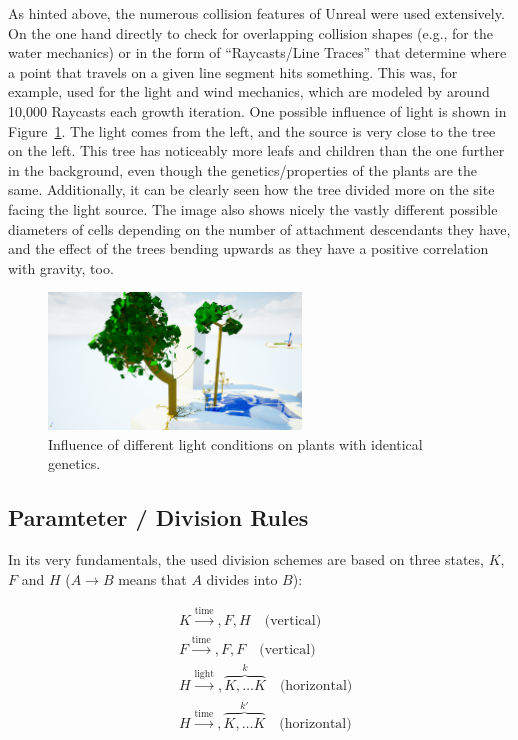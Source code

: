 \documentclass[11pt, abstract=on]{scrartcl}
\begin{document}
As hinted above, the numerous collision features of Unreal were used extensively. On the one hand directly to check for overlapping collision shapes (e.g., for the water mechanics) or in the form of ``Raycasts/Line Traces'' that determine where a point that travels on a given line segment hits something. This was, for example, used for the light and wind mechanics, which are modeled by around 10,000 Raycasts each growth iteration.
One possible influence of light is shown in Figure~\ref{fig:GrowToLight}. The light comes from the left, and the source is very close to the tree on the left. This tree has noticeably more leafs and children than the one further in the background, even though the genetics/properties of the plants are the same. Additionally, it can be clearly seen how the tree divided more on the site facing the light source. The image also shows nicely the vastly different possible diameters of cells depending on the number of attachment descendants they have, and the effect of the trees bending upwards as they have a positive correlation with gravity, too. 

\begin{figure}
 	 \centering
 	    \includegraphics[width=0.6\textwidth]{SS_GrowToLight.png}
 	 \caption{Influence of different light conditions on plants with identical genetics.}
 	 \label{fig:GrowToLight}
\end{figure}

\subsection{Paramteter / Division Rules}
In its very fundamentals, the used division schemes are based on three states, $K$, $F$ and $H$ ($A \rightarrow B$ means that $A$ divides into $B$):

\begin{align}
	&K \xrightarrow {\text{time}}, F, H \quad \text{(vertical)} \label{eq:K} \\
	&F \xrightarrow {\text{time}}, F, F \quad \text{(vertical)} \label{eq:F}\\
	&H \xrightarrow {\text{light}}, \overbrace{ K, \ldots K}^{k} \quad \text{(horizontal)}  \label{eq:HLight} \\
	&H \xrightarrow {\text{time}}, \overbrace{ K, \ldots K}^{k'} \quad \text{(horizontal)} \label{eq:HTime}
\end{align}
\end{document}
